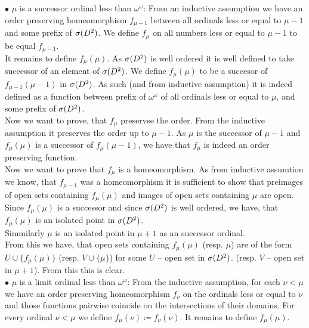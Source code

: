 $\bullet$ $\mu$ is a successor ordinal less than $\omega^\omega$: From an inductive assumption 
we have an order preserving homeomorphism $f_{\mu - 1}$ between all ordinals 
less or equal to $\mu - 1$ and some prefix of ${{\sigma}(D^2)}$. 
We define $f_\mu$ on all numbers less or equal to $\mu - 1$ to be equal $f_{\mu-1}$. \\
It remains to define $f_\mu(\mu)$. 
As ${{\sigma}(D^2)}$ is well ordered it is well defined to take successor of an element of ${{\sigma}(D^2)}$. 
We define $f_\mu(\mu)$ to be a succesor of $f_{\mu - 1}(\mu-1)$ in ${{\sigma}(D^2)}$. As such (and from 
inductive assumption) it is indeed defined as a function between prefix of $\omega^\omega$ of all 
ordinals less or equal to $\mu$, and 
some prefix of ${{\sigma}(D^2)}$.
\\
Now we want to prove, that $f_\mu$ preservse the order. From the inductive assumption 
it preserves the order up to $\mu - 1$. As $\mu$ is the successor of $\mu - 1$ and 
$f_\mu(\mu)$ is a successor of $f_\mu(\mu-1)$, we have that $f_\mu$ is indeed an order preserving 
function. \\
Now we want to prove that $f_\mu$ is a homeomorphism. As from inductive assumtion we know, 
that $f_{\mu - 1}$ was a homeomorphism it is sufficient to show that preimages of open 
sets containing $f_\mu(\mu)$ and images of open sets containing $\mu$ are open. \\
Since $f_\mu(\mu)$ is a successor and since ${{\sigma}(D^2)}$ is well ordered, we have, that $f_\mu(\mu)$ 
is an isolated point in ${{\sigma}(D^2)}$. \\
Simmilarly $\mu$ is an isolated point in $\mu + 1$ as an successor ordinal. \\
From this we have, that open sets containing $f_\mu(\mu)$ (resp. $\mu$) are of the form 
$U \cup \{f_\mu(\mu)\}$ (resp. $V \cup \{\mu\}$) for some $U$ -- open set in ${{\sigma}(D^2)}$. 
(resp. $V$ -- open set in $\mu + 1$).
From this this is clear. \\
$\bullet$ $\mu$ is a limit ordinal less than $\omega^\omega$:  
From the inductive assumption, for each $\nu < \mu$ we have an order preserving homeomorphism 
$f_\nu$ on the ordinals less or equal to $\nu$ and those functions pairwise coincide 
on the intersections 
of their domains. For every ordinal $\nu < \mu$ we define 
$f_\mu(\nu) \coloneqq f_\nu(\nu)$. It remains to define $f_\mu(\mu)$. \\
